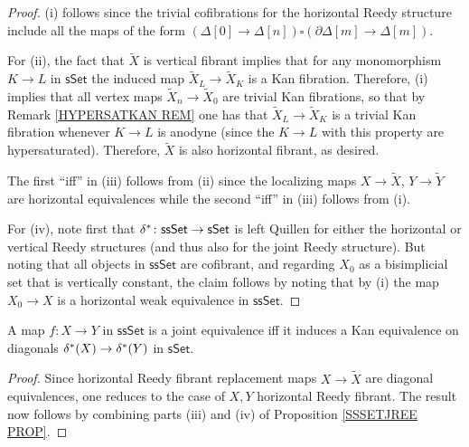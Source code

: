 \documentclass[a4paper,10pt
]{article}%
\begin{document}
\begin{proof}
(i) follows since the trivial cofibrations for the horizontal Reedy structure include all the maps of the form
$(\Delta[0] \to \Delta[n]) \square (\partial \Delta[m] \to \Delta[m])$.

For (ii), the fact that $\tilde{X}$ is vertical fibrant
implies that for any monomorphism $K \to L$ in $\mathsf{sSet}$
the induced map $\tilde{X}_L \to \tilde{X}_K$ is a Kan fibration. Therefore, (i) implies that all vertex maps
$\tilde{X}_{n} \to \tilde{X}_{0}$
are trivial Kan fibrations, so that by
Remark \ref{HYPERSATKAN REM} one has that 
$\tilde{X}_L \to \tilde{X}_K$ is a trivial Kan fibration whenever
$K \to L$ is anodyne
(since the $K \to L$ with this property are hypersaturated).
Therefore, $\tilde{X}$ is also horizontal fibrant, as desired.


The first ``iff'' in (iii) follows from (ii) since the localizing maps 
$X \to \tilde{X}$, $Y \to \tilde{Y}$
are horizontal equivalences
while the second ``iff'' in (iii) follows from (i).

For (iv), note first that 
$\delta^{\**} \colon \mathsf{ssSet} \to \mathsf{sSet}$
is left Quillen for either the horizontal or vertical Reedy structures (and thus also for the joint Reedy structure).
But noting that all objects in $\mathsf{ssSet}$ are cofibrant, and regarding 
$X_{0}$ as a bisimplicial set that is vertically constant, 
the claim follows by noting that by (i) the map
$X_{0} \to X$ is a horizontal weak equivalence in $\mathsf{ssSet}$.
\end{proof}


\begin{corollary}\label{WEAKDIAG COR}
	A map $f\colon X \to Y$ in $\mathsf{ssSet}$ is a joint equivalence iff it induces a Kan equivalence on diagonals
	$\delta^{\**}(X) \to \delta^{\**}(Y)$ in $\mathsf{sSet}$.
\end{corollary}

\begin{proof}
	Since horizontal Reedy fibrant replacement maps
	$X \to \tilde{X}$ are diagonal equivalences, 
	one reduces to the case of $X,Y$ horizontal Reedy fibrant. The result now follows by combining
	parts (iii) and (iv) of Proposition \ref{SSSETJREE PROP}.
\end{proof}
\end{document}
